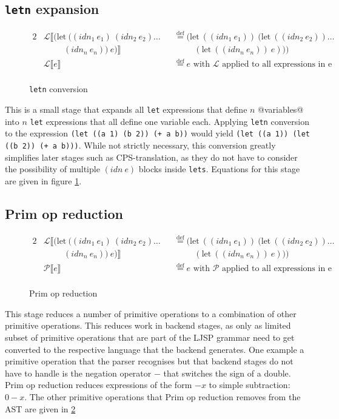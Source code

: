 \documentclass[11pt]{report}
\newcommand{\eqdef}{\stackrel{\text{def}}{=}}%
\begin{document}
\subsection{\texttt{letn} expansion}
\begin{figure}[ht]
\begin{alignat*}{2}
&\mathcal{L}\llbracket (\text{let}\ ((idn_1\ e_1)\ (idn_2\ e_2)\dots &&\eqdef (\text{let}\ ((idn_1\ e_1))\ (\text{let}\ ((idn_2\ e_2)) \dots \\
&\hspace{1cm} (idn_n\ e_n))\ e)\rrbracket &&\hspace{1cm}(\text{let}\ ((idn_n\ e_n))\ e)))\\
&\mathcal{L}\llbracket e \rrbracket && \eqdef e\text{ with $\mathcal{L}$ applied to all expressions in e}\\
\end{alignat*}
\caption{\texttt{letn} conversion}
\label{letnconversion}
\end{figure}
This is a small stage that expands all \texttt{let} expressions that define $n$ @variables@ into $n$ \texttt{let} expressions that all define one variable each. Applying \texttt{letn} conversion to the expression \texttt{(let ((a 1) (b 2)) (+ a b))} would yield \texttt{(let ((a 1)) (let ((b 2)) (+ a b)))}. While not strictly necessary, this conversion greatly simplifies later stages such as CPS-translation, as they do not have to consider the possibility of multiple $(idn\ e)$ blocks inside \texttt{lets}. Equations for this stage are given in figure \ref{letnconversion}.

\subsection{Prim op reduction}
\begin{figure}[ht]
\begin{alignat*}{2}
&\mathcal{L}\llbracket (\text{let}\ ((idn_1\ e_1)\ (idn_2\ e_2)\dots &&\eqdef (\text{let}\ ((idn_1\ e_1))\ (\text{let}\ ((idn_2\ e_2)) \dots \\
&\hspace{1cm} (idn_n\ e_n))\ e)\rrbracket &&\hspace{1cm}(\text{let}\ ((idn_n\ e_n))\ e)))\\
&\mathcal{P}\llbracket e \rrbracket && \eqdef e\text{ with $\mathcal{P}$ applied to all expressions in e}\\
\end{alignat*}
\caption{Prim op reduction}
\label{primopreduction}
\end{figure}
This stage reduces a number of primitive operations to a combination of other primitive operations. This reduces work in backend stages, as only as limited subset of primitive operations that are part of the LJSP grammar need to get converted to the respective language that the backend generates. One example a primitive operation that the parser recognises but that backend stages do not have to handle is the negation operator $-$ that switches the sign of a double. Prim op reduction reduces expressions of the form $-x$ to simple subtraction: $0-x$. The other primitive operations that Prim op reduction removes from the AST are given in \ref{primopreduction}
\end{document}
